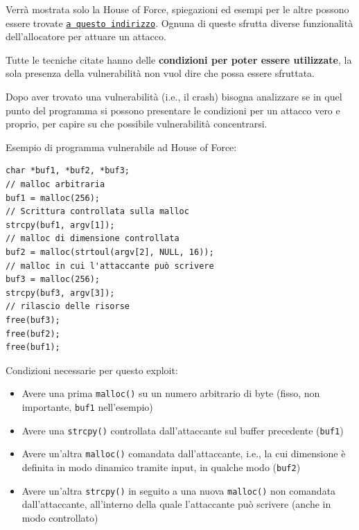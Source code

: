 Verrà mostrata solo la House of Force, spiegazioni ed esempi per le altre possono essere trovate \href{https://github.com/shellphish/how2heap}{\texttt{a questo indirizzo}}. Ognuna di queste sfrutta diverse funzionalità dell'allocatore per attuare un attacco.

Tutte le tecniche citate hanno delle \textbf{condizioni per poter essere utilizzate}, la sola presenza della vulnerabilità non vuol dire che possa essere sfruttata.

Dopo aver trovato una vulnerabilità (i.e., il crash) bisogna analizzare se in quel punto del programma si possono presentare le condizioni per un attacco vero e proprio, per capire su che possibile vulnerabilità concentrarsi.


Esempio di programma vulnerabile ad House of Force:
\begin{verbatim}
char *buf1, *buf2, *buf3;
// malloc arbitraria
buf1 = malloc(256);
// Scrittura controllata sulla malloc
strcpy(buf1, argv[1]); 
// malloc di dimensione controllata
buf2 = malloc(strtoul(argv[2], NULL, 16));
// malloc in cui l'attaccante può scrivere
buf3 = malloc(256);
strcpy(buf3, argv[3]);
// rilascio delle risorse
free(buf3);
free(buf2);
free(buf1);
\end{verbatim}

Condizioni necessarie per questo exploit:
\begin{itemize}
	\item Avere una prima \texttt{malloc()} su un numero arbitrario di byte (fisso, non importante, \texttt{buf1} nell'esempio)
    
	\item Avere una \texttt{strcpy()} controllata dall'attaccante sul buffer precedente (\texttt{buf1})
    
	\item Avere un'altra \texttt{malloc()} comandata dall'attaccante, i.e., la cui dimensione è definita in modo dinamico tramite input, in qualche modo (\texttt{buf2})
    
	\item Avere un'altra \texttt{strcpy()} in seguito a una nuova \texttt{malloc()} non comandata dall'attaccante, all'interno della quale l'attaccante può scrivere (anche in modo controllato)
\end{itemize}

